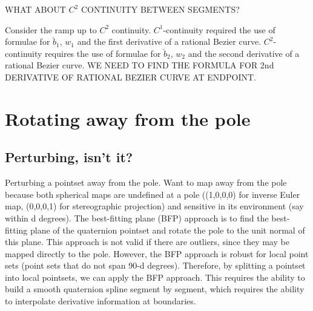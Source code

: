 \documentclass[12pt]{article}
\begin{document}
WHAT ABOUT $C^2$ CONTINUITY BETWEEN SEGMENTS?

Consider the ramp up to $C^2$ continuity.
$C^1$-continuity required the use of formulae for $\breve{b}_1$, $w_1$ and the first derivative 
of a rational Bezier curve.
$C^2$-continuity requires the use of formulae for $\breve{b}_2$, $w_2$ and the second derivative 
of a rational Bezier curve.
WE NEED TO FIND THE FORMULA FOR 2nd DERIVATIVE OF RATIONAL BEZIER CURVE AT ENDPOINT.


\clearpage

\section{Rotating away from the pole}

\subsection{Perturbing, isn't it?}

Perturbing a pointset away from the pole.
Want to map away from the pole because both spherical maps are undefined at a pole
((1,0,0,0) for inverse Euler map, (0,0,0,1) for stereographic projection)
and sensitive in its environment (say within d degrees).
The best-fitting plane (BFP) approach is to find the best-fitting plane of the quaternion
pointset and rotate the pole to the unit normal of this plane.
This approach is not valid if there are outliers, since they may be mapped directly
to the pole.
However, the BFP approach is robust for local point sets (point sets 
that do not span 90-d degrees).
Therefore, by splitting a pointset into local pointsets, we can apply the BFP approach.
This requires the ability to build a smooth quaternion spline segment by segment, which
requires the ability to interpolate derivative information at boundaries.
\end{document}
